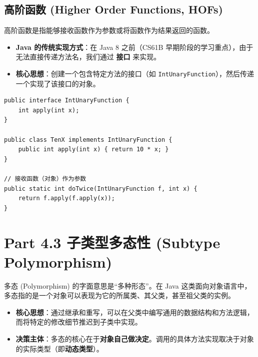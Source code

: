 \documentclass[12pt, a4paper, openany]{ctexbook} %
\begin{document}
\subsection{高阶函数 (Higher Order Functions, HOFs)}
高阶函数是指能够接收函数作为参数或将函数作为结果返回的函数。

\begin{itemize}
    \item \textbf{Java 的传统实现方式}：在 Java 8 之前（CS61B 早期阶段的学习重点），由于无法直接传递方法名，我们通过 \textbf{接口} 来实现。
    \item \textbf{核心思想}：创建一个包含特定方法的接口（如 \texttt{IntUnaryFunction}），然后传递一个实现了该接口的对象。
\end{itemize}

\begin{lstlisting}
public interface IntUnaryFunction {
    int apply(int x);
}

public class TenX implements IntUnaryFunction {
    public int apply(int x) { return 10 * x; }
}

// 接收函数（对象）作为参数
public static int doTwice(IntUnaryFunction f, int x) {
    return f.apply(f.apply(x));
}
\end{lstlisting}

\section{Part 4.3 子类型多态性 (Subtype Polymorphism)}
多态 (Polymorphism) 的字面意思是“多种形态”。在 Java 这类面向对象语言中，多态指的是一个对象可以表现为它的所属类、其父类，甚至祖父类的实例。

\begin{itemize}
    \item \textbf{核心思想}：通过继承和重写，可以在父类中编写通用的数据结构和方法逻辑，而将特定的修改细节推迟到子类中实现。
    \item \textbf{决策主体}：多态的核心在于\textbf{对象自己做决定}。调用的具体方法实现取决于对象的实际类型（即\textbf{动态类型}）。
\end{itemize}
\end{document}
